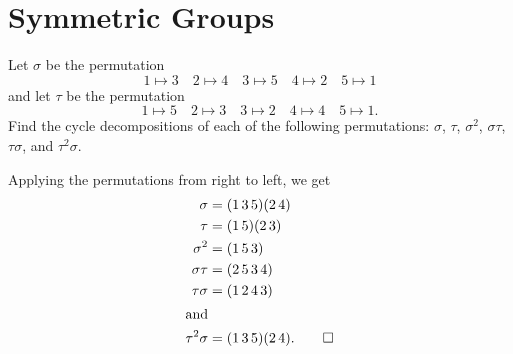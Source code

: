 \section{Symmetric Groups}

 Let $\sigma$ be the permutation
\begin{equation*}
  1\mapsto3 \quad 2\mapsto4 \quad 3\mapsto5 \quad 4\mapsto2 \quad 5\mapsto1
\end{equation*}
and let $\tau$ be the permutation
\begin{equation*}
  1\mapsto5 \quad 2\mapsto3 \quad 3\mapsto2 \quad 4\mapsto4 \quad 5\mapsto1.
\end{equation*}
Find the cycle decompositions of each of the following permutations:
$\sigma$, $\tau$, $\sigma^2$, $\sigma\tau$, $\tau\sigma$, and
$\tau^2\sigma$.
\begin{solution}
  Applying the permutations from right to left, we get
  \begin{align*}
    \sigma &= (1\,3\,5)(2\,4) \\
    \tau &= (1\,5)(2\,3) \\
    \sigma^2 &= (1\,5\,3) \\
    \sigma\tau &= (2\,5\,3\,4) \\
    \tau\sigma &= (1\,2\,4\,3) \\
    \intertext{and}
    \tau^2\sigma &= (1\,3\,5)(2\,4). \qedhere
  \end{align*}
\end{solution}

